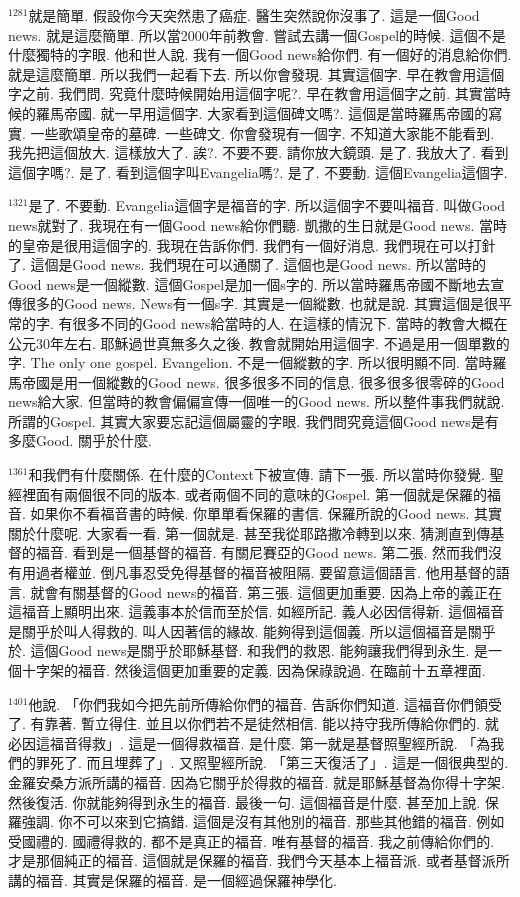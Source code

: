 \documentclass{book}
\begin{document}
$^{1281}$就是簡單.
假設你今天突然患了癌症.
醫生突然說你沒事了.
這是一個Good news.
就是這麼簡單.
所以當2000年前教會.
嘗試去講一個Gospel的時候.
這個不是什麼獨特的字眼.
他和世人說.
我有一個Good news給你們.
有一個好的消息給你們.
就是這麼簡單.
所以我們一起看下去.
所以你會發現.
其實這個字.
早在教會用這個字之前.
我們問.
究竟什麼時候開始用這個字呢?.
早在教會用這個字之前.
其實當時候的羅馬帝國.
就一早用這個字.
大家看到這個碑文嗎?.
這個是當時羅馬帝國的寫實.
一些歌頌皇帝的墓碑.
一些碑文.
你會發現有一個字.
不知道大家能不能看到.
我先把這個放大.
這樣放大了.
誒?.
不要不要.
請你放大鏡頭.
是了.
我放大了.
看到這個字嗎?.
是了.
看到這個字叫Evangelia嗎?.
是了.
不要動.
這個Evangelia這個字.

$^{1321}$是了.
不要動.
Evangelia這個字是福音的字.
所以這個字不要叫福音.
叫做Good news就對了.
我現在有一個Good news給你們聽.
凱撒的生日就是Good news.
當時的皇帝是很用這個字的.
我現在告訴你們.
我們有一個好消息.
我們現在可以打針了.
這個是Good news.
我們現在可以通關了.
這個也是Good news.
所以當時的Good news是一個縱數.
這個Gospel是加一個s字的.
所以當時羅馬帝國不斷地去宣傳很多的Good news.
News有一個s字.
其實是一個縱數.
也就是說.
其實這個是很平常的字.
有很多不同的Good news給當時的人.
在這樣的情況下.
當時的教會大概在公元30年左右.
耶穌過世真無多久之後.
教會就開始用這個字.
不過是用一個單數的字.
The only one gospel.
Evangelion.
不是一個縱數的字.
所以很明顯不同.
當時羅馬帝國是用一個縱數的Good news.
很多很多不同的信息.
很多很多很零碎的Good news給大家.
但當時的教會偏偏宣傳一個唯一的Good news.
所以整件事我們就說.
所謂的Gospel.
其實大家要忘記這個屬靈的字眼.
我們問究竟這個Good news是有多麼Good.
關乎於什麼.

$^{1361}$和我們有什麼關係.
在什麼的Context下被宣傳.
請下一張.
所以當時你發覺.
聖經裡面有兩個很不同的版本.
或者兩個不同的意味的Gospel.
第一個就是保羅的福音.
如果你不看福音書的時候.
你單單看保羅的書信.
保羅所說的Good news.
其實關於什麼呢.
大家看一看.
第一個就是.
甚至我從耶路撒冷轉到以來.
猜測直到傳基督的福音.
看到是一個基督的福音.
有關尼賽亞的Good news.
第二張.
然而我們沒有用過者權並.
倒凡事忍受免得基督的福音被阻隔.
要留意這個語言.
他用基督的語言.
就會有關基督的Good news的福音.
第三張.
這個更加重要.
因為上帝的義正在這福音上顯明出來.
這義事本於信而至於信.
如經所記.
義人必因信得新.
這個福音是關乎於叫人得救的.
叫人因著信的緣故.
能夠得到這個義.
所以這個福音是關乎於.
這個Good news是關乎於耶穌基督.
和我們的救恩.
能夠讓我們得到永生.
是一個十字架的福音.
然後這個更加重要的定義.
因為保祿說過.
在臨前十五章裡面.

$^{1401}$他說.
「你們我如今把先前所傳給你們的福音.
告訴你們知道.
這福音你們領受了.
有靠著.
暫立得住.
並且以你們若不是徒然相信.
能以持守我所傳給你們的.
就必因這福音得救」.
這是一個得救福音.
是什麼.
第一就是基督照聖經所說.
「為我們的罪死了.
而且埋葬了」.
又照聖經所說.
「第三天復活了」.
這是一個很典型的.
金羅安桑方派所講的福音.
因為它關乎於得救的福音.
就是耶穌基督為你得十字架.
然後復活.
你就能夠得到永生的福音.
最後一句.
這個福音是什麼.
甚至加上說.
保羅強調.
你不可以來到它搞錯.
這個是沒有其他別的福音.
那些其他錯的福音.
例如受國禮的.
國禮得救的.
都不是真正的福音.
唯有基督的福音.
我之前傳給你們的.
才是那個純正的福音.
這個就是保羅的福音.
我們今天基本上福音派.
或者基督派所講的福音.
其實是保羅的福音.
是一個經過保羅神學化.
\end{document}
